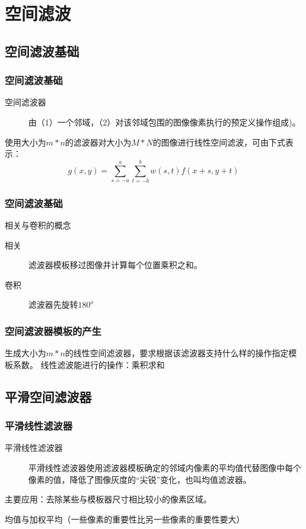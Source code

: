\documentclass[notheorems,serif,table,compress]{beamer}  %
\begin{document}
\section{空间滤波}
\subsection{空间滤波基础}
\begin{frame}
\frametitle{空间滤波基础}
 
 \begin{description}
 \item [空间滤波器]由（1）一个邻域，（2）对该邻域包围的图像像素执行的预定义操作组成)。
 \end{description}
 使用大小为$m*n$的滤波器对大小为$M*N$的图像进行线性空间滤波，可由下式表示：
\begin{equation} \label {3.13}
g(x,y)=\sum_{s=-a}^{a}\sum_{t=-b}^{b}w(s,t)f(x+s,y+t)
\end{equation}
 \end{frame}

\begin{frame}
\frametitle{空间滤波基础}
 相关与卷积的概念
 \begin{description}
 \item [相关]滤波器模板移过图像并计算每个位置乘积之和。
 \item [卷积]滤波器先旋转$180^{o}$
 \end{description}
 
 \end{frame}

\begin{frame}
\frametitle{空间滤波器模板的产生}
 生成大小为$m*n$的线性空间滤波器，要求根据该滤波器支持什么样的操作指定模板系数。
线性滤波能进行的操作：乘积求和 
 
 \end{frame}

\subsection{平滑空间滤波器}

\begin{frame}
\frametitle{平滑线性滤波器}
 \begin{description}
 \item [平滑线性滤波器]平滑线性滤波器使用滤波器模板确定的邻域内像素的平均值代替图像中每个像素的值，降低了图像灰度的“尖锐”变化，也叫均值滤波器。
 \end{description}

主要应用：去除某些与模板器尺寸相比较小的像素区域。

 均值与加权平均（一些像素的重要性比另一些像素的重要性要大）
 \end{frame}
\end{document}
